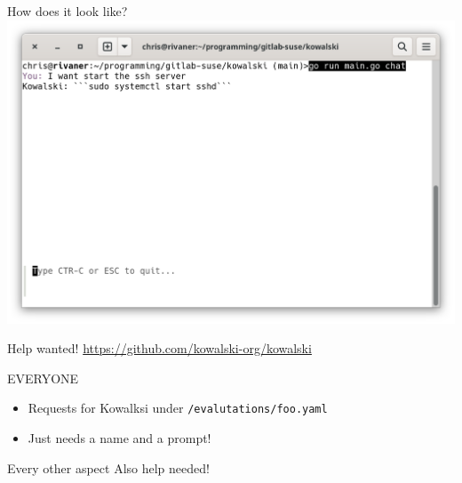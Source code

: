 \documentclass[aspectratio=169]{beamer}
\begin{document}
\begin{frame}{How does it look like?}
\includegraphics[width=.8\linewidth]{Startsshd.png}
\end{frame}

\begin{frame}{Help wanted!}
\href{https://github.com/kowalski-org/kowalski}{https://github.com/kowalski-org/kowalski}
\begin{block}{EVERYONE}
\begin{itemize}
  \item Requests for Kowalksi under \texttt{/evalutations/foo.yaml}
  \item Just needs a name and a prompt!
\end{itemize}
\end{block}
\begin{block}{Every other aspect}
Also help needed!
\end{block}
\end{frame}
\end{document}
